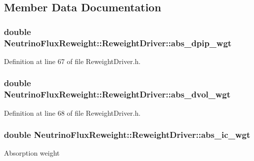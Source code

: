 \subsection{Member Data Documentation}
\hypertarget{class_neutrino_flux_reweight_1_1_reweight_driver_a39f06df253604d15c9c1a77dc77b7fad}{
\subsubsection[{abs\-\_\-dpip\-\_\-wgt}]{\setlength{\rightskip}{0pt plus 5cm}double Neutrino\-Flux\-Reweight\-::\-Reweight\-Driver\-::abs\-\_\-dpip\-\_\-wgt}}\label{class_neutrino_flux_reweight_1_1_reweight_driver_a39f06df253604d15c9c1a77dc77b7fad}


Definition at line 67 of file Reweight\-Driver.\-h.

\hypertarget{class_neutrino_flux_reweight_1_1_reweight_driver_aa30940f6b8614220a4b5a0402b6db2b2}{
\subsubsection[{abs\-\_\-dvol\-\_\-wgt}]{\setlength{\rightskip}{0pt plus 5cm}double Neutrino\-Flux\-Reweight\-::\-Reweight\-Driver\-::abs\-\_\-dvol\-\_\-wgt}}\label{class_neutrino_flux_reweight_1_1_reweight_driver_aa30940f6b8614220a4b5a0402b6db2b2}


Definition at line 68 of file Reweight\-Driver.\-h.

\hypertarget{class_neutrino_flux_reweight_1_1_reweight_driver_a9c6a48cbe08d905d133d51822636ad16}{
\subsubsection[{abs\-\_\-ic\-\_\-wgt}]{\setlength{\rightskip}{0pt plus 5cm}double Neutrino\-Flux\-Reweight\-::\-Reweight\-Driver\-::abs\-\_\-ic\-\_\-wgt}}\label{class_neutrino_flux_reweight_1_1_reweight_driver_a9c6a48cbe08d905d133d51822636ad16}
Absorption weight 

